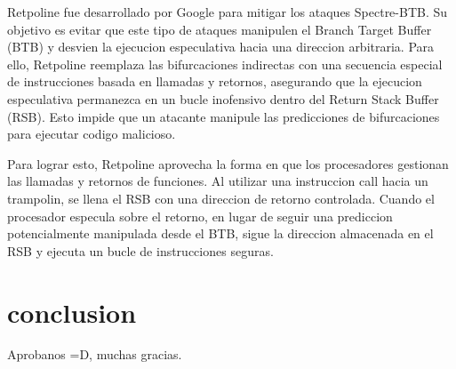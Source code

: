 \documentclass[lettersize,compsoc]{IEEEtran}
\begin{document}
Retpoline fue desarrollado por Google para mitigar los ataques Spectre-BTB. Su objetivo es evitar que este tipo de ataques manipulen el Branch Target Buffer (BTB) y desvien la ejecucion especulativa hacia una direccion arbitraria. Para ello, Retpoline reemplaza las bifurcaciones indirectas con una secuencia especial de instrucciones basada en llamadas y retornos, asegurando que la ejecucion especulativa permanezca en un bucle inofensivo dentro del Return Stack Buffer (RSB). Esto impide que un atacante manipule las predicciones de bifurcaciones para ejecutar codigo malicioso.

Para lograr esto, Retpoline aprovecha la forma en que los procesadores gestionan las llamadas y retornos de funciones. Al utilizar una instruccion call hacia un trampolin, se llena el RSB con una direccion de retorno controlada. Cuando el procesador especula sobre el retorno, en lugar de seguir una prediccion potencialmente manipulada desde el BTB, sigue la direccion almacenada en el RSB y ejecuta un bucle de instrucciones seguras.

\section{conclusion}
Aprobanos =D, muchas gracias.

\begin{thebibliography}{2}

\end{thebibliography}
\end{document}
